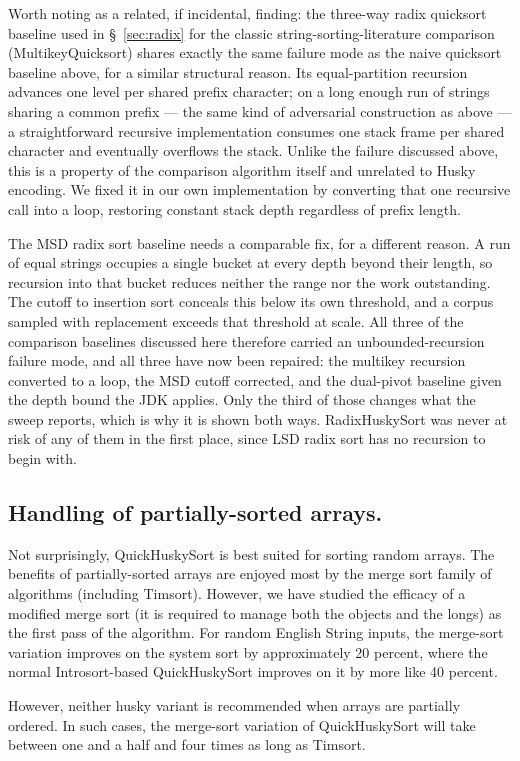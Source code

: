 \documentclass[twoside,leqno,twocolumn]{article}
\begin{document}
Worth noting as a related, if incidental, finding:
the three-way radix quicksort baseline used in \S~\ref{sec:radix} for the classic string-sorting-literature comparison (MultikeyQuicksort)
shares exactly the same failure mode as the naive quicksort baseline above, for a similar structural reason.
Its equal-partition recursion advances one level per shared prefix character;
on a long enough run of strings sharing a common prefix — the same kind of adversarial construction as above —
a straightforward recursive implementation consumes one stack frame per shared character and eventually overflows the stack.
Unlike the failure discussed above, this is a property of the comparison algorithm itself and unrelated to Husky encoding.
We fixed it in our own implementation by converting that one recursive call into a loop,
restoring constant stack depth regardless of prefix length.

The MSD radix sort baseline needs a comparable fix, for a different reason.
A run of equal strings occupies a single bucket at every depth beyond their length,
so recursion into that bucket reduces neither the range nor the work outstanding.
The cutoff to insertion sort conceals this below its own threshold,
and a corpus sampled with replacement exceeds that threshold at scale.
All three of the comparison baselines discussed here therefore carried an unbounded-recursion failure mode,
and all three have now been repaired: the multikey recursion converted to a loop, the MSD cutoff corrected,
and the dual-pivot baseline given the depth bound the JDK applies.
Only the third of those changes what the sweep reports, which is why it is shown both ways.
RadixHuskySort was never at risk of any of them in the first place,
since LSD radix sort has no recursion to begin with.

\subsection{Handling of partially-sorted arrays.}

Not surprisingly, QuickHuskySort is best suited for sorting random arrays.
The benefits of partially-sorted arrays are enjoyed most by the merge sort family of algorithms (including Timsort).
However, we have studied the efficacy of a modified merge sort (it is required to manage both the objects and the longs) as the first pass of the algorithm.
For random English String inputs,
the merge-sort variation improves on the system sort by approximately 20 percent, where the normal Introsort-based QuickHuskySort improves on it by more like 40 percent.

However, neither husky variant is recommended when arrays are partially ordered.
In such cases, the merge-sort variation of QuickHuskySort will take between one and a half and four times as long as Timsort.
\end{document}
